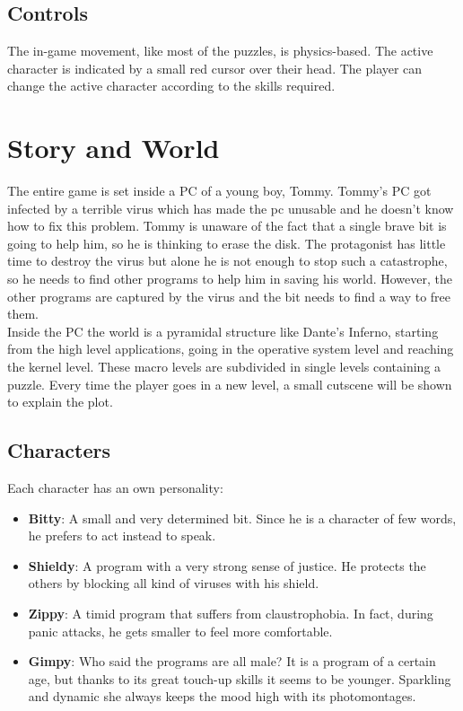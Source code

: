 \documentclass[12pt, a4paper]{report}
\begin{document}
\section*{Controls}
The in-game movement, like most of the puzzles, is physics-based. The active character is indicated by a small red cursor over their head. The player can change the active character according to the skills required.




\chapter{Story and World}
The entire game is set inside a PC of a young boy, Tommy. Tommy’s PC got infected by a terrible virus which has made the pc unusable and he doesn’t know how to fix this problem. Tommy is unaware of the fact that a single brave bit is going to help him, so he is thinking to erase the disk. The protagonist has little time to destroy the virus but alone he is not enough to stop such a catastrophe, so he needs to find other programs to help him in saving his world. However, the other programs are captured by the virus and the bit needs to find a way to free them.\\
Inside the PC the world is a pyramidal structure like Dante’s Inferno, starting from the high level applications, going in the operative system level and reaching the kernel level. These macro levels are subdivided in single levels containing a puzzle.  Every time the player goes in a new level, a small cutscene will be shown to explain the plot.

\section*{Characters}
Each character has an own personality:
\begin{itemize}
\item \textbf{Bitty}: A small and very determined bit. Since he is a character of few words, he prefers to act instead to speak.
\item \textbf{Shieldy}: A program with a very strong sense of justice. He protects the others by blocking all kind of viruses with his shield.
\item \textbf{Zippy}: A timid program that suffers from claustrophobia. In fact, during panic attacks, he gets smaller to feel more comfortable.
\item \textbf{Gimpy}: Who said the programs are all male? It is a program of a certain age, but thanks to its great touch-up skills it seems to be younger. Sparkling and dynamic she always keeps the mood high with its photomontages.
\end{itemize}
\end{document}
